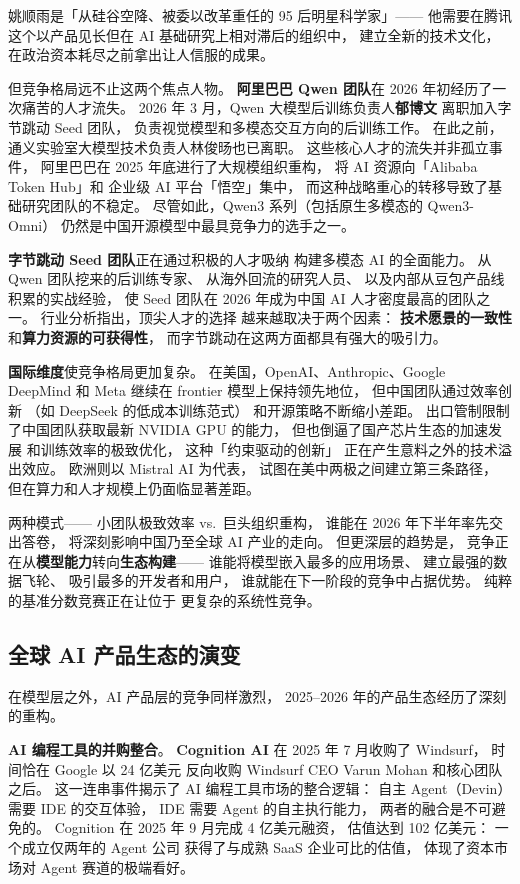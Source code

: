 姚顺雨是「从硅谷空降、被委以改革重任的 95 后明星科学家」——
他需要在腾讯这个以产品见长但在 AI 基础研究上相对滞后的组织中，
建立全新的技术文化，
在政治资本耗尽之前拿出让人信服的成果。

但竞争格局远不止这两个焦点人物。
\textbf{阿里巴巴 Qwen 团队}在 2026 年初经历了一次痛苦的人才流失。
2026 年 3 月，Qwen 大模型后训练负责人\textbf{郁博文}
离职加入字节跳动 Seed 团队，
负责视觉模型和多模态交互方向的后训练工作。
在此之前，通义实验室大模型技术负责人林俊旸也已离职。
这些核心人才的流失并非孤立事件，
阿里巴巴在 2025 年底进行了大规模组织重构，
将 AI 资源向「Alibaba Token Hub」和
企业级 AI 平台「悟空」集中，
而这种战略重心的转移导致了基础研究团队的不稳定。
尽管如此，Qwen3 系列（包括原生多模态的 Qwen3-Omni）
仍然是中国开源模型中最具竞争力的选手之一。

\textbf{字节跳动 Seed 团队}正在通过积极的人才吸纳
构建多模态 AI 的全面能力。
从 Qwen 团队挖来的后训练专家、
从海外回流的研究人员、
以及内部从豆包产品线积累的实战经验，
使 Seed 团队在 2026 年成为中国 AI 人才密度最高的团队之一。
行业分析指出，顶尖人才的选择
越来越取决于两个因素：
\textbf{技术愿景的一致性}
和\textbf{算力资源的可获得性}，
而字节跳动在这两方面都具有强大的吸引力。

\textbf{国际维度}使竞争格局更加复杂。
在美国，OpenAI、Anthropic、Google DeepMind 和 Meta
继续在 frontier 模型上保持领先地位，
但中国团队通过效率创新
（如 DeepSeek 的低成本训练范式）
和开源策略不断缩小差距。
出口管制限制了中国团队获取最新 NVIDIA GPU 的能力，
但也倒逼了国产芯片生态的加速发展
和训练效率的极致优化，
这种「约束驱动的创新」
正在产生意料之外的技术溢出效应。
欧洲则以 Mistral AI 为代表，
试图在美中两极之间建立第三条路径，
但在算力和人才规模上仍面临显著差距。

两种模式——
小团队极致效率 vs.\ 巨头组织重构，
谁能在 2026 年下半年率先交出答卷，
将深刻影响中国乃至全球 AI 产业的走向。
但更深层的趋势是，
竞争正在从\textbf{模型能力}转向\textbf{生态构建}——
谁能将模型嵌入最多的应用场景、
建立最强的数据飞轮、
吸引最多的开发者和用户，
谁就能在下一阶段的竞争中占据优势。
纯粹的基准分数竞赛正在让位于
更复杂的系统性竞争。

\subsection{全球 AI 产品生态的演变}

在模型层之外，AI 产品层的竞争同样激烈，
2025--2026 年的产品生态经历了深刻的重构。

\textbf{AI 编程工具的并购整合}。
\textbf{Cognition AI} 在 2025 年 7 月收购了 Windsurf，
时间恰在 Google 以 24 亿美元
反向收购 Windsurf CEO Varun Mohan 和核心团队之后。
这一连串事件揭示了 AI 编程工具市场的整合逻辑：
自主 Agent（Devin）需要 IDE 的交互体验，
IDE 需要 Agent 的自主执行能力，
两者的融合是不可避免的。
Cognition 在 2025 年 9 月完成 4 亿美元融资，
估值达到 102 亿美元：
一个成立仅两年的 Agent 公司
获得了与成熟 SaaS 企业可比的估值，
体现了资本市场对 Agent 赛道的极端看好。

